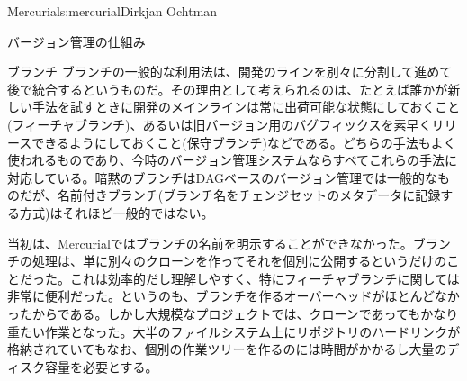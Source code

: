 \begin{aosachapter}{Mercurial}{s:mercurial}{Dirkjan Ochtman}
\begin{aosasect1}{バージョン管理の仕組み}
\begin{aosasect2}{ブランチ}
ブランチの一般的な利用法は、開発のラインを別々に分割して進めて後で統合するというものだ。その理由として考えられるのは、たとえば誰かが新しい手法を試すときに開発のメインラインは常に出荷可能な状態にしておくこと(フィーチャブランチ)、あるいは旧バージョン用のバグフィックスを素早くリリースできるようにしておくこと(保守ブランチ)などである。どちらの手法もよく使われるものであり、今時のバージョン管理システムならすべてこれらの手法に対応している。暗黙のブランチはDAGベースのバージョン管理では一般的なものだが、名前付きブランチ(ブランチ名をチェンジセットのメタデータに記録する方式)はそれほど一般的ではない。

当初は、Mercurialではブランチの名前を明示することができなかった。ブランチの処理は、単に別々のクローンを作ってそれを個別に公開するというだけのことだった。これは効率的だし理解しやすく、特にフィーチャブランチに関しては非常に便利だった。というのも、ブランチを作るオーバーヘッドがほとんどなかったからである。しかし大規模なプロジェクトでは、クローンであってもかなり重たい作業となった。大半のファイルシステム上にリポジトリのハードリンクが格納されていてもなお、個別の作業ツリーを作るのには時間がかかるし大量のディスク容量を必要とする。


\end{aosasect2}
\end{aosasect1}
\end{aosachapter}
